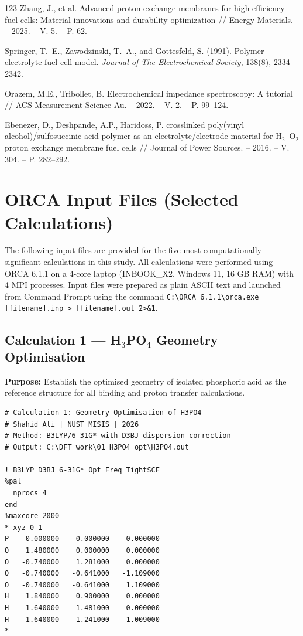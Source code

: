 \documentclass[12pt,a4paper]{report}
\begin{document}
\begin{thebibliography}{123}
 Zhang, J., et al. Advanced proton exchange membranes for high-efficiency fuel cells: Material innovations and durability optimization // Energy Materials. – 2025. – V. 5. – P. 62.

 Springer, T.~E., Zawodzinski, T.~A., and Gottesfeld, S. (1991). Polymer electrolyte fuel cell model. \textit{Journal of The Electrochemical Society}, 138(8), 2334–2342.

 Orazem, M.E., Tribollet, B. Electrochemical impedance spectroscopy: A tutorial // ACS Measurement Science Au. – 2022. – V. 2. – P. 99–124.

 Ebenezer, D., Deshpande, A.P., Haridoss, P. crosslinked poly(vinyl alcohol)/sulfosuccinic acid polymer as an electrolyte/electrode material for H\(_2\)–O\(_2\) proton exchange membrane fuel cells // Journal of Power Sources. – 2016. – V. 304. – P. 282–292.

\end{thebibliography}



\appendix

\chapter{ORCA Input Files (Selected Calculations)}

The following input files are provided for the five most computationally significant calculations in this study. All calculations were performed using ORCA 6.1.1 on a 4-core laptop (INBOOK\_X2, Windows 11, 16 GB RAM) with 4 MPI processes. Input files were prepared as plain ASCII text and launched from Command Prompt using the command \texttt{C:\textbackslash ORCA\_6.1.1\textbackslash orca.exe [filename].inp > [filename].out 2>\&1}.

\section{Calculation 1 — H\(_3\)PO\(_4\) Geometry Optimisation}

\textbf{Purpose:} Establish the optimised geometry of isolated phosphoric acid as the reference structure for all binding and proton transfer calculations.

\begin{verbatim}
# Calculation 1: Geometry Optimisation of H3PO4
# Shahid Ali | NUST MISIS | 2026
# Method: B3LYP/6-31G* with D3BJ dispersion correction
# Output: C:\DFT_work\01_H3PO4_opt\H3PO4.out

! B3LYP D3BJ 6-31G* Opt Freq TightSCF
%pal
  nprocs 4
end
%maxcore 2000
* xyz 0 1
P    0.000000    0.000000    0.000000
O    1.480000    0.000000    0.000000
O   -0.740000    1.281000    0.000000
O   -0.740000   -0.641000   -1.109000
O   -0.740000   -0.641000    1.109000
H    1.840000    0.900000    0.000000
H   -1.640000    1.481000    0.000000
H   -1.640000   -1.241000   -1.009000
*
\end{verbatim}
\end{document}
